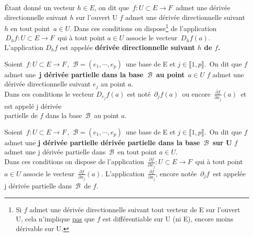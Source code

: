 Étant donné un vecteur \(h\in E\), on dit que \(\,f:U\subset E\to F\,\) admet une dérivée directionnelle suivant $h$ sur l'ouvert U \ssi $f$ admet une dérivée directionnelle suivant $h$ en tout point \(\,a\in U.\) Dans ces conditions on dispose\footnote{Si $f$ admet une dérivée directionnelle suivant tout vecteur de E sur l'ouvert U, cela n'implique \underline{pas} que $f$ est différentiable sur U (ni E), encore moins dérivable sur U.} de l'application \(\,D_hf:U\subset E\to F\,\) qui à tout point \(a\in U\) associe le vecteur \(\,D_hf(a)\). L'application \(D_hf\) est appelée \textbf{dérivée directionnelle suivant $h$ de $f$.}

\vspace{1.5cm}

\hspace*{0.8cm}Soient \(\,f:U\subset E\to F\,\), \(\ \mathcal{B}=(e_1,\cdots,e_p)\,\) une base de E et \(j\in \llbracket 1,p \rrbracket.\,\) On dit que $f$ admet une\, \textbf{j dérivée partielle dans la base \(\,\mathcal{B}\,\) au point} \(\,a\in U\) \ssi $f$ admet une dérivée directionnelle suivant $e_j$ au point $a$.\\Dans ces conditions le vecteur \(D_{e_j}f(a)\) est noté \(\,\partial_jf(a)\,\) ou encore \(\,\displaystyle \frac{\partial f}{\partial x_j}(a)\,\) et est appelé j dérivée\vspace{-0.1cm}\\
partielle de $f$ dans la base \(\,\mathcal{B}\,\) au point $a$.

\vspace{1.5cm}

Soient \(\,f:U\subset E\to F\,\), \(\ \mathcal{B}=(e_1,\cdots,e_p)\,\) une base de E et \(j\in \llbracket 1,p \rrbracket.\,\) On dit que $f$ admet une \textbf{j dérivée partielle dérivée partielle dans la base \(\,\mathcal{B}\,\) sur U} \ssi $f$ admet une j dérivée partielle dans \(\,\mathcal{B}\,\) en tout point \(a\in U\).\\
Dans ces conditions on dispose de l'application \(\, \displaystyle \frac{\partial f}{\partial x_j}:U\subset E \to F\,\) qui à tout point \(a\in U\) associe le vecteur \(\,\displaystyle \frac{\partial f}{\partial x_j}(a).\) L'application \(\, \displaystyle \frac{\partial f}{\partial x_j}\), encore notée \(\,\partial_j f\,\) est appelée j dérivée partielle dans \(\,\mathcal{B}\,\) de $f$.

